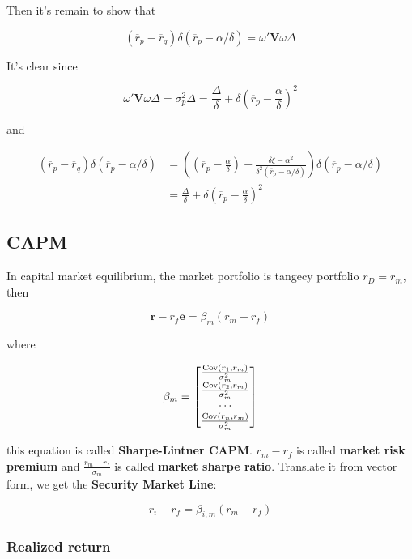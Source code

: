 \documentclass{article}
\begin{document}
Then it's remain to show that

\[ (\overline{r}_p-\overline{r}_q)\delta(\overline{r}_p-\alpha/\delta)=\omega'\mathbf{V}\omega\Delta \]

It's clear since

\[ \omega'\mathbf{V}\omega \Delta=\sigma_p^2\Delta=\frac{\Delta}{\delta}+\delta(\overline{r}_p-\frac{\alpha}{\delta})^2 \]

and

\[ \begin{aligned}
  (\overline{r}_p-\overline{r}_q)\delta(\overline{r}_p-\alpha/\delta)&=
  ((\overline{r}_p-\frac{\alpha}{\delta})+\frac{\delta\xi-\alpha^2}{\delta^2(\overline{r}_p-\alpha/\delta)})\delta(\overline{r}_p-\alpha/\delta)
  \\&=\frac{\Delta}{\delta}+\delta(\overline{r}_p-\frac{\alpha}{\delta})^2
\end{aligned} \]

\hypertarget{capm-1}{%
\subsection{CAPM}\label{capm-1}}

In capital market equilibrium, the market portfolio is tangecy portfolio
\(r_D={r}_m\), then

\[ \overline{\mathbf{r}}-r_f\mathbf{e}=\beta_m({{r}_m-r_f}) \]

where

\[ \beta_m=\begin{bmatrix}
  \frac{\operatorname{Cov}(r_1,r_m)}{\sigma^2_m}\\
  \frac{\operatorname{Cov}(r_2,r_m)}{\sigma^2_m}\\
  \cdots\\
  \frac{\operatorname{Cov}(r_n,r_m)}{\sigma^2_m}\\
\end{bmatrix} \]

this equation is called \textbf{Sharpe-Lintner CAPM}. \(r_m-r_f\) is
called \textbf{market risk premium} and \(\frac{r_m-r_f}{\sigma_m}\) is
called \textbf{market sharpe ratio}. Translate it from vector form, we
get the \textbf{Security Market Line}:

\[ 
r_i-r_f=\beta_{i,m}(r_m-r_f) 
\]

\hypertarget{realized-return}{%
\subsubsection{Realized return}\label{realized-return}}
\end{document}
